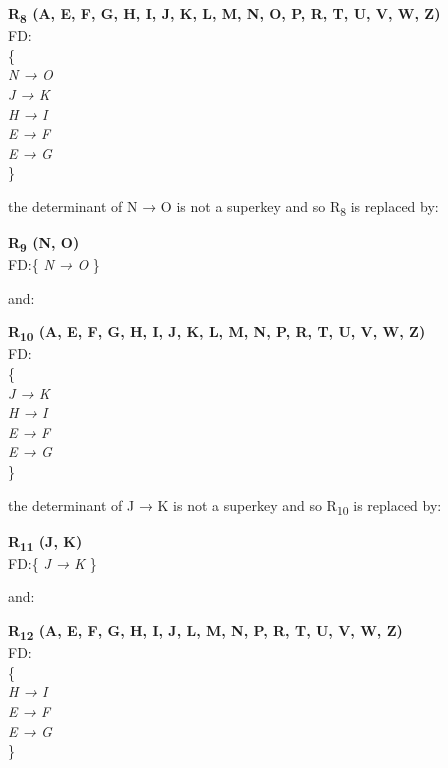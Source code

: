 \begin{adjustwidth}{2cm}{}
\textbf{R\textsubscript{8} (A, E, F, G, H, I, J, K, L, M, N, O, P, R, T, U, V, W, Z)}\\
FD:\\
\{\\
\textit{ 
N → O\\
J → K\\
H → I\\
E → F\\
E → G\\
}
\} \\
\end{adjustwidth}

the determinant of N → O is not a superkey and so R\textsubscript{8} is replaced by:\\

\begin{adjustwidth}{2cm}{}
\textbf{R\textsubscript{9} (N, O)}\\
FD:\{
\textit{ 
N → O 
}
\} \\
\end{adjustwidth} 

and:\\

\begin{adjustwidth}{2cm}{}
\textbf{R\textsubscript{10} (A, E, F, G, H, I, J, K, L, M, N, P, R, T, U, V, W, Z)}\\
FD:\\
\{\\
\textit{ 
J → K\\
H → I\\
E → F\\
E → G\\
}
\} \\
\end{adjustwidth} 

the determinant of J → K is not a superkey and so R\textsubscript{10} is replaced by:\\

\begin{adjustwidth}{2cm}{}
\textbf{R\textsubscript{11} (J, K)}\\
FD:\{
\textit{ 
J → K 
}
\} \\
\end{adjustwidth} 

and:\\

\begin{adjustwidth}{2cm}{}
\textbf{R\textsubscript{12} (A, E, F, G, H, I, J, L, M, N, P, R, T, U, V, W, Z)}\\
FD:\\
\{\\
\textit{ 
H → I\\
E → F\\
E → G\\
}
\} \\
\end{adjustwidth} 


